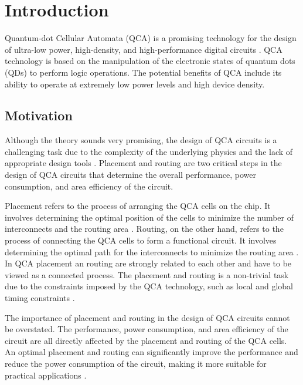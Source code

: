 
\chapter{Introduction}\label{chapter:introduction}
Quantum-dot Cellular Automata (QCA) is a promising technology for the design of ultra-low power, high-density, and high-performance digital circuits \cite{perri2012new}. QCA technology is based on the manipulation of the electronic states of quantum dots (QDs) to perform logic operations. The potential benefits of QCA include its ability to operate at extremely low power levels and high device density\cite{sen2015towards}.

\section{Motivation}
Although the theory sounds very promising, the design of QCA circuits is a challenging task due to the complexity of the underlying physics and the lack of appropriate design tools \cite{safoev2020design}. Placement and routing are two critical steps in the design of QCA circuits that determine the overall performance, power consumption, and area efficiency of the circuit.

Placement refers to the process of arranging the QCA cells on the chip. It involves determining the optimal position of the cells to minimize the number of interconnects and the routing area \cite{kahng2011vlsi}. Routing, on the other hand, refers to the process of connecting the QCA cells to form a functional circuit. It involves determining the optimal path for the interconnects to minimize the routing area \cite{kahng2011vlsi}. In QCA placement an routing are strongly related to each other and have to be viewed as a connected process. The placement and routing is a  non-trivial task due to the constraints imposed by the QCA technology, such as local and global timing constraints \cite{ortho}.

The importance of placement and routing in the design of QCA circuits cannot be overstated. The performance, power consumption, and area efficiency of the circuit are all directly affected by the placement and routing of the QCA cells. An optimal placement and routing can significantly improve the performance and reduce the power consumption of the circuit, making it more suitable for practical applications \cite{walter2018exact}.

